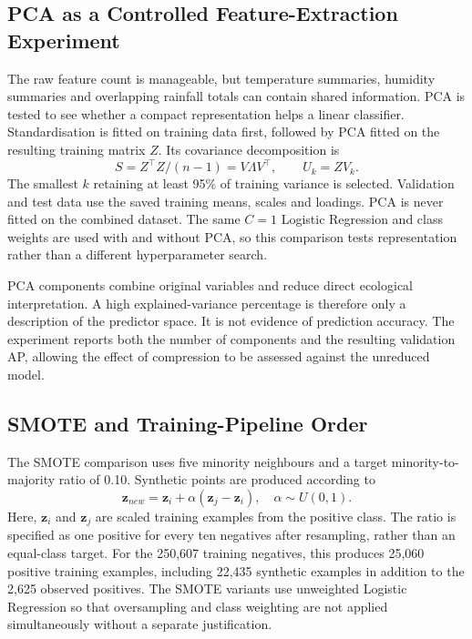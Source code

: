 \documentclass[conference,a4paper]{IEEEtran}
\begin{document}
\subsection{PCA as a Controlled Feature-Extraction Experiment}
The raw feature count is manageable, but temperature summaries, humidity summaries and overlapping rainfall totals can contain shared information. PCA is tested to see whether a compact representation helps a linear classifier. Standardisation is fitted on training data first, followed by PCA fitted on the resulting training matrix $Z$. Its covariance decomposition is
\begin{equation}
S=Z^\top Z/(n-1)=V\Lambda V^\top,\qquad U_k=ZV_k.
\end{equation}
The smallest $k$ retaining at least 95\% of training variance is selected. Validation and test data use the saved training means, scales and loadings. PCA is never fitted on the combined dataset. The same $C=1$ Logistic Regression and class weights are used with and without PCA, so this comparison tests representation rather than a different hyperparameter search.

PCA components combine original variables and reduce direct ecological interpretation. A high explained-variance percentage is therefore only a description of the predictor space. It is not evidence of prediction accuracy. The experiment reports both the number of components and the resulting validation AP, allowing the effect of compression to be assessed against the unreduced model.

\subsection{SMOTE and Training-Pipeline Order}
The SMOTE comparison uses five minority neighbours and a target minority-to-majority ratio of 0.10. Synthetic points are produced according to
\begin{equation}
\mathbf z_{new}=\mathbf z_i+\alpha(\mathbf z_j-\mathbf z_i),\quad \alpha\sim U(0,1).
\end{equation}
Here, $\mathbf z_i$ and $\mathbf z_j$ are scaled training examples from the positive class. The ratio is specified as one positive for every ten negatives after resampling, rather than an equal-class target. For the 250,607 training negatives, this produces 25,060 positive training examples, including 22,435 synthetic examples in addition to the 2,625 observed positives. The SMOTE variants use unweighted Logistic Regression so that oversampling and class weighting are not applied simultaneously without a separate justification.
\end{document}
